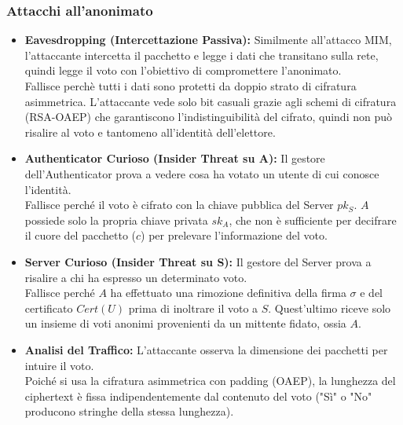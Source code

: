 \subsubsection{Attacchi all'anonimato}
\begin{itemize}
	\item \textbf{Eavesdropping (Intercettazione Passiva):}
	Similmente all'attacco MIM, l'attaccante intercetta il pacchetto e legge i dati che transitano sulla rete, quindi legge il voto con l'obiettivo di compromettere l'anonimato.\\
	Fallisce perchè tutti i dati sono protetti da doppio strato di cifratura asimmetrica. L'attaccante vede solo bit casuali grazie agli schemi di cifratura (RSA-OAEP) che garantiscono l'indistinguibilità del cifrato, quindi non può risalire al voto e tantomeno all'identità dell'elettore.
	
	\item \textbf{Authenticator Curioso (Insider Threat su A):} Il gestore dell'Authenticator prova a vedere cosa ha votato un utente di cui conosce l'identità.\\
	Fallisce perché il voto è cifrato con la chiave pubblica del Server $pk_S$. $A$ possiede solo la propria chiave privata $sk_A$, che non è sufficiente per decifrare il cuore del pacchetto ($c$) per prelevare l'informazione del voto.
	
	\item \textbf{Server Curioso (Insider Threat su S):} Il gestore del Server prova a risalire a chi ha espresso un determinato voto.\\
	Fallisce perché $A$ ha effettuato una rimozione definitiva della firma $\sigma$ e del certificato $Cert(U)$ prima di inoltrare il voto a $S$. Quest'ultimo riceve solo un insieme di voti anonimi provenienti da un mittente fidato, ossia $A$.
	
	\item \textbf{Analisi del Traffico:} L'attaccante osserva la dimensione dei pacchetti per intuire il voto.\\
	Poiché si usa la cifratura asimmetrica con padding (OAEP), la lunghezza del ciphertext è fissa indipendentemente dal contenuto del voto ("Sì" o "No" producono stringhe della stessa lunghezza).
\end{itemize}

